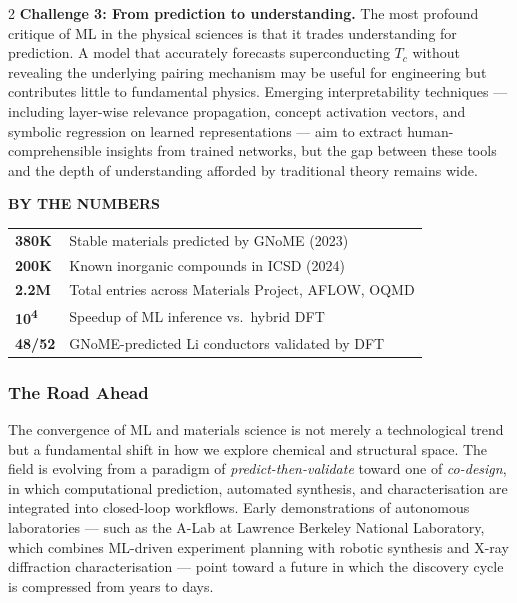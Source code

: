 \documentclass[a4paper,11pt]{article}
\begin{document}
\begin{multicols}{2}
\textbf{Challenge 3: From prediction to understanding.} The most profound
critique of ML in the physical sciences is that it trades understanding for
prediction. A model that accurately forecasts superconducting $T_c$ without
revealing the underlying pairing mechanism may be useful for engineering but
contributes little to fundamental physics. Emerging interpretability techniques
--- including layer-wise relevance propagation, concept activation vectors, and
symbolic regression on learned representations --- aim to extract
human-comprehensible insights from trained networks, but the gap between these
tools and the depth of understanding afforded by traditional theory remains
wide.

\begin{infobox}
{\sffamily\bfseries\color{accent}\small\MakeUppercase{By the Numbers}}

\vspace{4pt}
{\sffamily\footnotesize
\setlength{\tabcolsep}{0pt}
\begin{tabularx}{\linewidth}{@{}>{\bfseries\color{accent2}}lX@{}}
380K  & Stable materials predicted by GNoME (2023) \\
200K  & Known inorganic compounds in ICSD (2024) \\
2.2M  & Total entries across Materials Project, AFLOW, OQMD \\
10\textsuperscript{4} & Speedup of ML inference vs.\ hybrid DFT \\
48/52 & GNoME-predicted Li conductors validated by DFT \\
\end{tabularx}
}
\end{infobox}

\subsubsection{The Road Ahead}

The convergence of ML and materials science is not merely a technological trend
but a fundamental shift in how we explore chemical and structural space. The
field is evolving from a paradigm of \textit{predict-then-validate} toward one
of \textit{co-design}, in which computational prediction, automated synthesis,
and characterisation are integrated into closed-loop workflows. Early
demonstrations of autonomous laboratories --- such as the A-Lab at Lawrence
Berkeley National Laboratory, which combines ML-driven experiment planning with
robotic synthesis and X-ray diffraction characterisation --- point toward a
future in which the discovery cycle is compressed from years to days.


\end{multicols}
\end{document}
